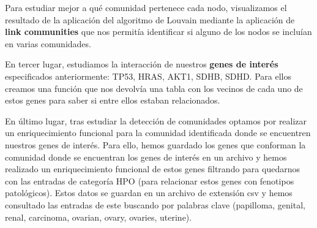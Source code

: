 \vspace{3pt}

Para estudiar mejor a qué comunidad pertenece cada nodo, visualizamos el resultado de la aplicación del algoritmo de Louvain mediante la aplicación de \textbf{link communities} que nos permitía identificar si alguno de los nodos se incluían en varias comunidades. 

\vspace{3pt}

En tercer lugar, estudiamos la interacción de nuestros \textbf{genes de interés} especificados anteriormente: TP53, HRAS, AKT1, SDHB, SDHD. Para ellos creamos una función que nos devolvía una tabla con los vecinos de cada uno de estos genes para saber si entre ellos estaban relacionados.

\vspace{3pt}

En último lugar, tras estudiar la detección de comunidades optamos por realizar un enriquecimiento funcional para la comunidad identificada donde se encuentren nuestros genes de interés. Para ello, hemos guardado los genes que conforman la comunidad donde se encuentran los genes de interés en un archivo y hemos realizado un enriquecimiento funcional de estos genes filtrando para quedarnos con las entradas de categoría HPO \cite{hpojax} (para relacionar estos genes con fenotipos patológicos).  Estos datos se guardan en un archivo de extensión csv y hemos consultado las entradas de este buscando por palabras clave (papilloma, genital, renal, carcinoma, ovarian, ovary, ovaries, uterine). 


